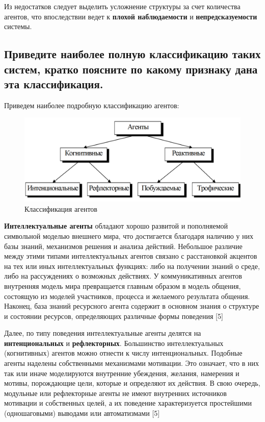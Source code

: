 \documentclass[14pt,a4paper,report]{report}
\begin{document}
Из недостатков следует выделить усложнение структуры за счет количества агентов, что впоследствии ведет к \textbf{плохой наблюдаемости} и \textbf{непредсказуемости} системы.

\subsection{Приведите наиболее полную классификацию таких систем, кратко поясните по какому признаку дана эта классификация.}

Приведем наиболее подробную классификацию агентов:

\begin{figure}[h!]
	\centering
	\includegraphics[scale = 0.37]{images/0_1.png}
	\caption{Классификация агентов}
\end{figure}

\textbf{Интеллектуальные агенты} обладают хорошо развитой и пополняемой символьной моделью внешнего мира, что достигается благодаря наличию у них базы знаний, механизмов решения и анализа действий. Небольшое различие между этими типами интеллектуальных агентов связано с расстановкой акцентов на тех или иных интеллектуальных функциях: либо на получении знаний о среде, либо на рассуждениях о возможных действиях. У коммуникативных агентов внутренняя модель мира превращается главным образом в модель общения, состоящую из моделей участников, процесса и желаемого результата общения. Наконец, база знаний ресурсного агента содержит в основном знания о структуре и состоянии ресурсов, определяющих различные формы поведения [5]

Далее, по типу поведения интеллектуальные агенты делятся на \textbf{интенциональных} и \textbf{рефлекторных}. Большинство интеллектуальных (когнитивных) агентов можно отнести к числу интенциональных. Подобные агенты наделены собственными механизмами мотивации. Это означает, что в них так или иначе моделируются внутренние убеждения, желания, намерения и мотивы, порождающие цели, которые и определяют их действия. В свою очередь, модульные или рефлекторные агенты не имеют внутренних источников мотивации и собственных целей, а их поведение характеризуется простейшими (одношаговыми) выводами или автоматизмами [5]
\end{document}
